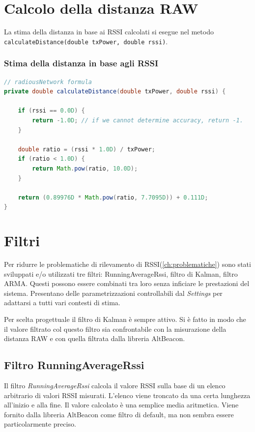 \section{Calcolo della distanza RAW}
La stima della distanza in base ai RSSI calcolati si esegue nel metodo \texttt{calculateDistance(double txPower, double rssi)}.

\subsubsection{Stima della distanza in base agli RSSI}
\begin{lstlisting}[language=Java]
// radiousNetwork formula
private double calculateDistance(double txPower, double rssi) {
	
	if (rssi == 0.0D) {
		return -1.0D; // if we cannot determine accuracy, return -1.
	}
	
	double ratio = (rssi * 1.0D) / txPower;
	if (ratio < 1.0D) {
		return Math.pow(ratio, 10.0D);
	}
	
	return (0.89976D * Math.pow(ratio, 7.7095D)) + 0.111D;
}
\end{lstlisting}

\section{Filtri}
Per ridurre le problematiche di rilevamento di RSSI(\ref{ch:problematiche}) sono stati sviluppati e/o utilizzati tre filtri: RunningAverageRssi, filtro di Kalman, filtro ARMA. Questi possono essere combinati tra loro senza inficiare le prestazioni del sistema. Presentano delle parametrizzazioni controllabili dal \textit{Settings} per adattarsi a tutti vari contesti di stima.

Per scelta progettuale il filtro di Kalman è sempre attivo. Si è fatto in modo che il valore filtrato col questo filtro sia confrontabile con la misurazione della distanza RAW e con quella filtrata dalla libreria AltBeacon.

\subsection{Filtro RunningAverageRssi}
Il filtro \textit{RunningAverageRssi} calcola il valore RSSI sulla base di un elenco arbitrario di valori RSSI misurati. L'elenco viene troncato da una certa lunghezza all'inizio e alla fine. Il valore calcolato è una semplice media aritmetica. Viene fornito dalla libreria AltBeacon come filtro di default, ma non sembra essere particolarmente preciso.

